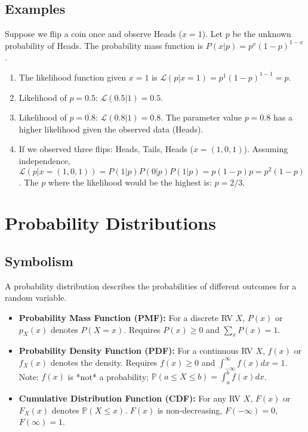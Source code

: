\documentclass{article}
\newcommand{\Prob}{\mathbb{P}} %
\newcommand{\Lik}{\mathcal{L}} %
\begin{document}
\subsection*{Examples}
Suppose we flip a coin once and observe Heads ($x=1$). Let $p$ be the unknown probability of Heads. The probability mass function is $P(x|p) = p^x (1-p)^{1-x}$.
\begin{enumerate}
    \item The likelihood function given $x=1$ is $\Lik(p | x=1) = p^1 (1-p)^{1-1} = p$.
    \item Likelihood of $p=0.5$: $\Lik(0.5 | 1) = 0.5$.
    \item Likelihood of $p=0.8$: $\Lik(0.8 | 1) = 0.8$.
    The parameter value $p=0.8$ has a higher likelihood given the observed data (Heads).
    \item If we observed three flips: Heads, Tails, Heads ($x=(1, 0, 1)$). Assuming independence, $\Lik(p | x=(1,0,1)) = P(1|p)P(0|p)P(1|p) = p(1-p)p = p^2(1-p)$. The $p$ where the likelihood would be the highest is: $\hat{p}=2/3$.
\end{enumerate}

\section{Probability Distributions}

\subsection*{Symbolism}
A probability distribution describes the probabilities of different outcomes for a random variable.
\begin{itemize}
    \item \textbf{Probability Mass Function (PMF):} For a discrete RV $X$, $P(x)$ or $p_X(x)$ denotes $P(X=x)$. Requires $P(x) \ge 0$ and $\sum_x P(x) = 1$.
    \item \textbf{Probability Density Function (PDF):} For a continuous RV $X$, $f(x)$ or $f_X(x)$ denotes the density. Requires $f(x) \ge 0$ and $\int_{-\infty}^{\infty} f(x) dx = 1$. Note: $f(x)$ is *not* a probability; $\Prob(a \le X \le b) = \int_a^b f(x) dx$.
    \item \textbf{Cumulative Distribution Function (CDF):} For any RV $X$, $F(x)$ or $F_X(x)$ denotes $\Prob(X \le x)$. $F(x)$ is non-decreasing, $F(-\infty)=0$, $F(\infty)=1$.
\end{itemize}
\end{document}
